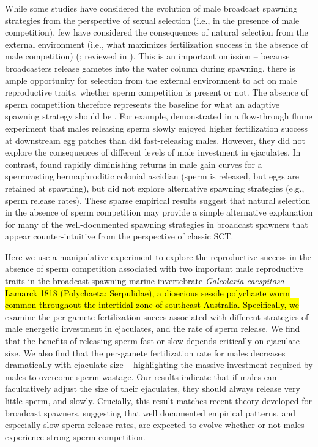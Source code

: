 \documentclass{article}
\begin{document}
While some studies have considered the evolution of male broadcast spawning strategies from the perspective of sexual selection (i.e., in the presence of male competition), few have considered the consequences of natural selection from the external environment (i.e., what maximizes fertilization success in the absence of male competition) (\citealt{Levitan2005}; reviewed in \citealt{LotterhosLevitan2011}). This is an important omission -- because broadcasters release gametes into the water column during spawning, there is ample opportunity for selection from the external environment to act on male reproductive traits, whether sperm competition is present or not. The absence of sperm competition therefore represents the baseline for what an adaptive spawning strategy should be \citep{MarshallBolton2007}. For example, \citet{MarshallBolton2007} demonstrated in a flow-through flume experiment that males releasing sperm slowly enjoyed higher fertilization success at downstream egg patches than did fast-releasing males. However, they did not explore the consequences of different levels of male investment in ejaculates. In contrast, \citet{JohnsonYund2009} found rapidly diminishing returns in male gain curves for a spermcasting hermaphroditic colonial ascidian (sperm is released, but eggs are retained at spawning), but did not explore alternative spawning strategies (e.g., sperm release rates). These sparse empirical results suggest that natural selection in the absence of sperm competition may provide a simple alternative explanation for many of the well-documented spawning strategies in broadcast spawners that appear counter-intuitive from the perspective of classic SCT. 

Here we use a manipulative experiment to explore the reproductive success in the absence of sperm competition associated with two important male reproductive traits in the broadcast spawning marine invertebrate \textit{Galeolaria caespitosa} \hl{Lamarck 1818 (Polychaeta: Serpulidae), a dioecious sessile polychaete worm common throughout the intertidal zone of southeast Australia. Specifically, we }examine the per-gamete fertilization succes associated with different strategies of male energetic investment in ejaculates, and the rate of sperm release. We find that the benefits of releasing sperm fast or slow depends critically on ejaculate size. We also find that the per-gamete fertilization rate for males decreases dramatically with ejaculate size -- highlighting the massive investment required by males to overcome sperm wastage. Our results indicate that if males can facultatively adjust the size of their ejaculates, they should always release very little sperm, and slowly. Crucially, this result matches recent theory developed for broadcast spawners, suggesting that well documented empirical patterns, and especially slow sperm release rates, are expected to evolve whether or not males experience strong sperm competition.
\end{document}
